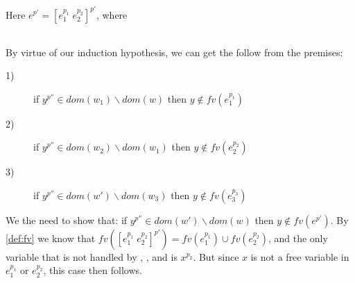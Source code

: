 \item[\runa{App}] Here $e^{p'}=[e_1^{p_1}\;e_2^{p_2}]^{p'}$, where
\begin{figure}[H]
	\setlength\tabcolsep{8pt}
	\begin{tabular}{l}
		
	\end{tabular}
\end{figure}
By virtue of our induction hypothesis, we can get the follow from the premises:
\begin{description}
	\item[1)] if $y^{p''}\in dom(w_1)\backslash dom(w)$ then $y\notin fv(e_1^{p_1})$
	\item[2)] if $y^{p''}\in dom(w_2)\backslash dom(w_1)$ then $y\notin fv(e_2^{p_2})$
	\item[3)] if $y^{p''}\in dom(w')\backslash dom(w_3)$ then $y\notin fv(e_3^{p_3})$
\end{description}
We the need to show that: if $y^{p''}\in dom(w')\backslash dom(w)$ then $y\notin fv(e^{p'})$.
By \cref{def:fv} we know that $fv([e_1^{p_1}\;e_2^{p_2}]^{p'})=fv(e_1^{p_1})\cup fv(e_2^{p_2})$, and the only variable that is not handled by , , and  is $x^{p_2}$.
But since $x$ is not a free variable in $e_1^{p_1}$ or $e_2^{p_2}$, this case then follows.
